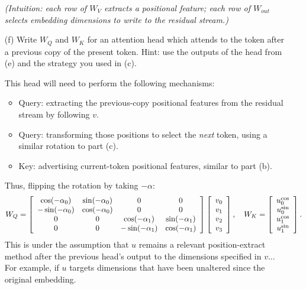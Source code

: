 \documentclass[11pt]{article}
\newenvironment{answerbox}%
  {\begin{mdframed}[linecolor=darkgray,%
                    roundcorner=10pt,innertopmargin=10pt,%
                    innerbottommargin=10pt,skipabove=12pt,skipbelow=12pt]}%
  {\end{mdframed}}
\begin{document}
\begin{itemize}
\begin{answerbox}
\textit{(Intuition: each row of $W_V$ extracts a positional feature; each row of $W_{out}$ selects embedding dimensions to write to the residual stream.)}
\end{answerbox}

    \item[(f)] Write $W_Q$ and $W_K$ for an attention head which attends to the token after a previous copy of the present token. Hint: use the outputs of the head from (e) and the strategy you used in (c).

\begin{answerbox}
    This head will need to perform the following mechanisms:
    \begin{itemize}
        \item Query: extracting the previous-copy positional features from the residual stream by following $v$.
        \item Query: transforming those positions to select the \textit{next} token, using a similar rotation to part (c).
        \item Key: advertising current-token positional features, similar to part (b). 
    \end{itemize}

    Thus, flipping the rotation by taking $-\alpha$:
$$
W_Q = \left[
\begin{array}{*{4}c}
\cos (-\alpha_0) & \sin (-\alpha_0) & 0 & 0 \\
-\sin (-\alpha_0) & \cos (-\alpha_0) & 0 & 0 \\
0 & 0 & \cos (-\alpha_1) & \sin (-\alpha_1) \\
0 & 0 & -\sin (-\alpha_1) & \cos (-\alpha_1) \\
\end{array}
\right]
\left[
\begin{array}{*{1}c}
v_0 \\
v_1 \\
v_2 \\
v_3 \\
\end{array}
\right], \quad
W_K = \left[
\begin{array}{*{1}c}
u^{\cos}_0 \\
u^{\sin}_0 \\
u^{\cos}_1 \\
u^{\sin}_1 \\
\end{array}
\right].
$$
This is under the assumption that $u$ remains a relevant position-extract method after the previous head's output to the dimensions specified in $v$... For example, if $u$ targets dimensions that have been unaltered since the original embedding.
\end{answerbox}
\end{itemize}
\end{document}
